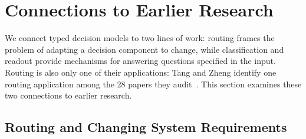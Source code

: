 \section{Connections to Earlier Research}
\label{sec:lineages}

We connect typed decision models to two lines of work: routing frames the problem of adapting a decision component to change, while classification and readout provide mechanisms for answering questions specified in the input. Routing is also only one of their applications: Tang and Zheng identify one routing application among the 28 papers they audit~\cite{tang2026typed}. This section examines these two connections to earlier research.

\subsection{Routing and Changing System Requirements}
\label{sec:routing}

